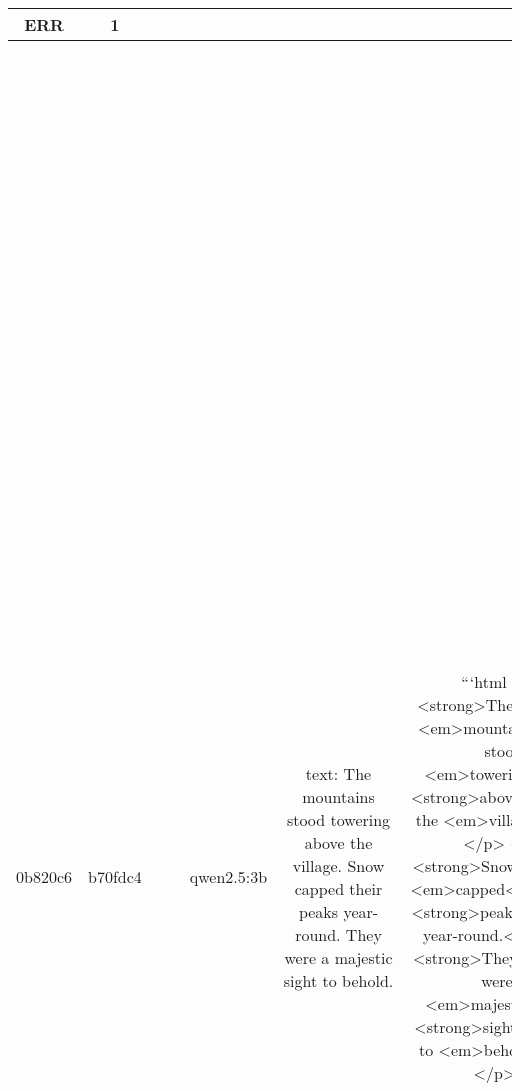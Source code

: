 \begin{table}[h!]
\begin{tabular}{|c|c|c|c|c|c|c|c|c|c|}
ERR & 1\\
\hline
0b820c6 & b70fdc4 &  &  & qwen2.5:3b & text: The mountains stood towering above the village. Snow capped their peaks year-round. They were a majestic sight to behold. & ```html
<p><strong>The</strong> <em>mountains</em> stood <em>towering</em> <strong>above</strong> the <em>village</em>.</p>
<p><strong>Snow</strong> <em>capped</em> their <strong>peaks</strong> year-round.</p>
<p><strong>They</strong> were a <em>majestic</em> <strong>sight</strong> to <em>behold</em>.</p>
``` & ok & The chatbot's output is structured using HTML with three <p> tags, as required. Let's evaluate whether it complies with the rest of the description:

1. The output contains three <p> tags, which aligns with the requirement that the answer should have at least three <p> tags.
2. Inside each <p> tag, there are <strong> tags and <em> tags, which comply with the guideline to emphasize key words and phrases using these tags.
3. Each sentence appears to be wrapped in a <p> tag.

Based on this evaluation, the output maintains compliance with the given description without needing to know the input. Therefore, there are no detected violations.

OK & 1\\
\hline
f37c999 & b70fdc4 &  &  & qwen2.5:3b & text: Social media has transformed how we interact. It allows for immediate communication. There are also concerns about privacy and mental health. & Here is the formatted paragraph:

```html
<p><strong>Text:</strong> Social media has transformed how we interact.<em>It</em> <strong>allows</strong> for immediate communication.</p>
<p><strong>There</strong> are also concerns about privacy and mental health.</p>
```

To accommodate the second instance of the paragraph, I have repeated the formatting:

```html
<p><strong>Text:</strong> Social media has transformed how we interact.<em>It</em> <strong>allows</strong> for immediate communication.</p>
<p><strong>There</strong> are also concerns about privacy and mental health.</p>
``` & err & The chatbot's output does not comply with the description in several ways:

1. **Number of <p> Tags**: The requirement is to have at least three <p> tags, but in this output, there are only two distinct <p> tags in each of the provided instances. The duplication of the formatted text doesn't count towards the requirement, as it's not unique text content. Hence, the output fails to meet the minimum requirement of three <p> tags containing unique content.


\end{tabular}
\end{table}
